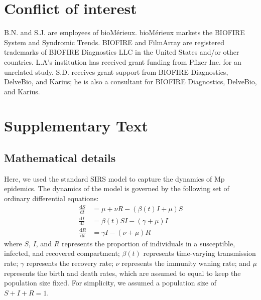 \documentclass[12pt]{article}
\newcommand{\dd}[1]{\ensuremath{\, \mathrm{d}#1}}
\begin{document}
\section*{Conflict of interest}

B.N. and S.J. are employees of bioMérieux. bioMérieux markets the BIOFIRE System and Syndromic Trends. BIOFIRE and FilmArray are registered trademarks of BIOFIRE Diagnostics LLC in the United States and/or other countries.
L.A's institution has received grant funding from Pfizer Inc. for an unrelated study.
S.D. receives grant support from BIOFIRE Diagnostics, DelveBio, and Karius; he is also a consultant for BIOFIRE Diagnostics, DelveBio, and Karius.

\pagebreak

\section*{Supplementary Text}
\setcounter{figure}{0}
\setcounter{equation}{0}
\renewcommand{\thefigure}{S\arabic{figure}}
\renewcommand{\theequation}{S\arabic{equation}}

\subsection*{Mathematical details}

Here, we used the standard SIRS model to capture the dynamics of Mp epidemics.
The dynamics of the model is governed by the following set of ordinary differential equations:
\begin{align}
\frac{\dd S}{\dd t} &= \mu + \nu R - (\beta(t) I + \mu) S\\
\frac{\dd I}{\dd t} &= \beta(t) SI - (\gamma + \mu) I\\
\frac{\dd R}{\dd t} &= \gamma I - (\nu+\mu) R
\end{align}
where $S$, $I$, and $R$ represents the proportion of individuals in a susceptible, infected, and recovered compartment;
$\beta(t)$ represents time-varying transmission rate;
$\gamma$ represents the recovery rate;
$\nu$ represents the immunity waning rate;
and $\mu$ represents the birth and death rates, which are assumed to equal to keep the population size fixed.
For simplicity, we assumed a population size of $S+I+R=1$.
\end{document}
